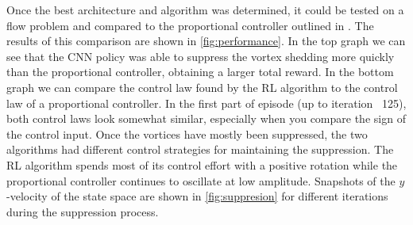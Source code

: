 \documentclass{article}
\begin{document}
Once the best architecture and algorithm was determined, it could be tested on a flow problem and compared to the proportional controller outlined in \cite{morton2018deep}. The results of this comparison are shown in \cref{fig:performance}. In the top graph we can see that the CNN policy was able to suppress the vortex shedding more quickly than the proportional controller, obtaining a larger total reward. In the bottom graph we can compare the control law found by the RL algorithm to the control law of a proportional controller. In the first part of episode (up to iteration ~125), both control laws look somewhat similar, especially when you compare the sign of the control input. Once the vortices have mostly been suppressed, the two algorithms had different control strategies for maintaining the suppression. The RL algorithm spends most of its control effort with a positive rotation while the proportional controller continues to oscillate at low amplitude. Snapshots of the $y$-velocity of the state space are shown in \cref{fig:suppresion} for different iterations during the suppression process.
\end{document}
